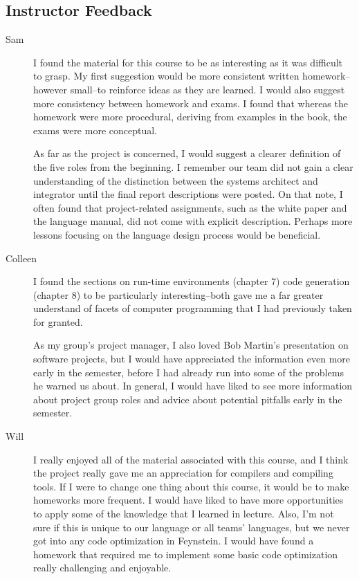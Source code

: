 \subsection{Instructor Feedback}
\begin{description}
\item[Sam] I found the material for this course to be as interesting
  as it was difficult to grasp. My first suggestion would be more
  consistent written homework--however small--to reinforce ideas as
  they are learned. I would also suggest more consistency between
  homework and exams. I found that whereas the homework were more
  procedural, deriving from examples in the book, the exams were more
  conceptual.

  As far as the project is concerned, I would suggest a clearer
  definition of the five roles from the beginning. I remember our team
  did not gain a clear understanding of the distinction between the
  systems architect and integrator until the final report descriptions
  were posted. On that note, I often found that project-related
  assignments, such as the white paper and the language manual, did
  not come with explicit description. Perhaps more lessons focusing on
  the language design process would be beneficial.

\item[Colleen] I found the sections on run-time environments (chapter
  7) code generation (chapter 8) to be particularly interesting--both
  gave me a far greater understand of facets of computer programming
  that I had previously taken for granted. 

  As my group's project manager,
  I also loved Bob Martin's presentation on software projects, but I would
  have appreciated the information even more early in the semester, before
  I had already run into some of the problems he warned us about. In general,
  I would have liked to see  more information about project group roles and 
  advice about potential pitfalls early in the semester.

\item[Will] I really enjoyed all of the material associated with this
  course, and I think the project really gave me an appreciation for
  compilers and compiling tools. If I were to change one thing about
  this course, it would be to make homeworks more frequent. I would
  have liked to have more opportunities to apply some of the knowledge
  that I learned in lecture. Also, I'm not sure if this is unique to
  our language or all teams' languages, but we never got into any code
  optimization in Feynstein. I would have found a homework that
  required me to implement some basic code optimization really
  challenging and enjoyable.


\end{description}
